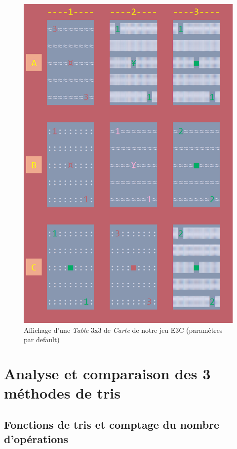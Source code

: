 \documentclass{report}
\begin{document}
\begin{figure}[H]
\centering
\includegraphics[scale=0.6]{../graphe/table.png}
\caption{Affichage d'une \textit{Table} 3x3 de \textit{Carte} de notre jeu E3C (paramètres par default)}
\end{figure}


\chapter{Analyse et comparaison des 3 méthodes de tris}

\qquad 

\section{Fonctions de tris et comptage du nombre d'opérations}
\end{document}

